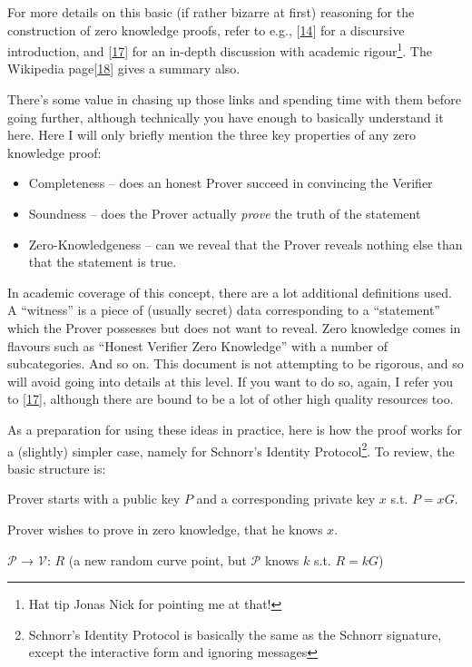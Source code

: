 \documentclass[10pt,a4paper]{article}
\providecommand{\tightlist}{%
  \setlength{\itemsep}{0pt}\setlength{\parskip}{0pt}}
\begin{document}
For more details on this basic (if rather bizarre at first) reasoning
for the construction of zero knowledge proofs, refer to e.g.,
{[}\protect\hyperlink{anchor-26}{14}{]} for a discursive introduction,
and {[}\protect\hyperlink{anchor-27}{17}{]} for an in-depth discussion
with academic rigour\footnote{Hat tip Jonas Nick for pointing me at that!}.
The Wikipedia page{[}\protect\hyperlink{anchor-28}{18}{]} gives a
summary also.

There's some value in chasing up those links and spending time with them
before going further, although technically you have enough to basically
understand it here. Here I will only briefly mention the three key
properties of any zero knowledge proof:

\begin{itemize}
\tightlist
\item
  Completeness -- does an honest Prover succeed in convincing the
  Verifier
\item
  Soundness -- does the Prover actually \emph{prove} the truth of the
  statement
\item
  Zero-Knowledgeness -- can we reveal that the Prover reveals nothing
  else than that the statement is true.
\end{itemize}

In academic coverage of this concept, there are a lot additional
definitions used. A ``witness'' is a piece of (usually secret) data
corresponding to a ``statement'' which the Prover possesses but does not
want to reveal. Zero knowledge comes in flavours such as ``Honest
Verifier Zero Knowledge'' with a number of subcategories. And so on.
This document is not attempting to be rigorous, and so will avoid going
into details at this level. If you want to do so, again, I refer you to
{[}\protect\hyperlink{anchor-27}{17}{]}, although there are bound to be
a lot of other high quality resources too.

As a preparation for using these ideas in practice, here is how the
proof works for a (slightly) simpler case, namely for Schnorr's Identity
Protocol\footnote{Schnorr's Identity Protocol is basically the same as the Schnorr signature, 
except the interactive form and ignoring messages}. To review, the basic structure is:

Prover starts with a public key $P$ and a corresponding private key $x$ s.t. $P=xG$.

Prover wishes to prove in zero knowledge, that he knows $x$.

$\mathcal{P}$ → $\mathcal{V}$: $R$ (a new random curve point, but $\mathcal{P}$ knows $k$ s.t. $R=kG$)
\end{document}
